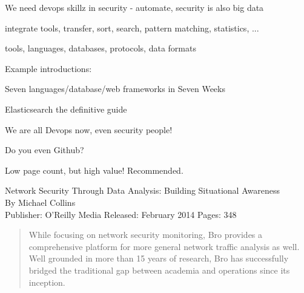 \documentclass[20pt,landscape,a4paper,footrule]{foils}
\begin{document}
\begin{list1}
\item We need devops skillz in security - automate, security is also big data
\item integrate tools, transfer, sort, search, pattern matching, statistics, ...
\item tools, languages, databases, protocols, data formats
\item Example introductions:
\begin{list2}
\item Seven languages/database/web frameworks in Seven Weeks
\item Elasticsearch the definitive guide\\
\item {}
\item {}
\end{list2}
\end{list1}

\centerline{We are all Devops now, even security people!}

Do you even Github? \smiley {}



Low page count, but high value! Recommended.

Network Security Through Data Analysis: Building Situational Awareness\\
By Michael Collins\\
Publisher: O'Reilly Media
Released: February 2014 Pages: 348





\begin{quote}
While focusing on network security monitoring, Bro provides a comprehensive platform for more general network traffic analysis as well. Well grounded in more than 15 years of research, Bro has successfully bridged the traditional gap between academia and operations since its inception.
\end{quote}


\end{document}
